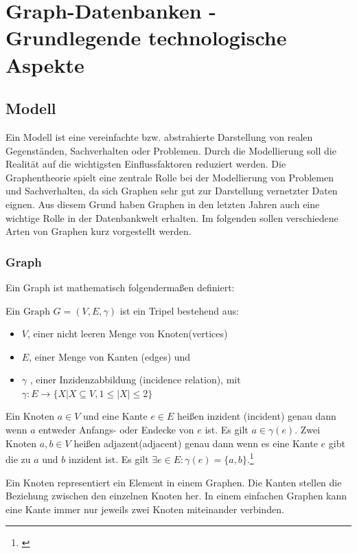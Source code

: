 \chapter{Graph-Datenbanken - Grundlegende technologische Aspekte}
\section{Modell}
Ein Modell ist eine vereinfachte bzw. abstrahierte Darstellung von realen Gegenständen, Sachverhalten oder Problemen.
Durch die Modellierung soll die Realität auf die wichtigsten Einflussfaktoren reduziert werden.
Die Graphentheorie spielt eine zentrale Rolle bei der Modellierung von Problemen und Sachverhalten, da sich Graphen sehr gut zur Darstellung vernetzter Daten eignen.
Aus diesem Grund haben Graphen in den letzten Jahren auch eine wichtige Rolle in der Datenbankwelt erhalten.
Im folgenden sollen verschiedene Arten von Graphen kurz vorgestellt werden.
\subsection{Graph}
Ein Graph ist mathematisch folgendermaßen definiert:
\begin{definition}
	Ein $\text{Graph } G=(V,E,\gamma)$ ist ein Tripel bestehend aus:
	\begin{itemize}
		\item $V$, einer nicht leeren Menge von Knoten(vertices)
		\item $E$, einer Menge von Kanten (edges) und
		\item $\gamma$ , einer Inzidenzabbildung (incidence relation), mit\\
		$\gamma : E \longrightarrow \{X | X \subseteq V, 1 \leq |X| \leq 2\}$
	\end{itemize}

	Ein Knoten $a \in V$ und eine Kante $e \in E$ heißen inzident (incident)
	genau dann wenn $a$ entweder Anfangs- oder Endecke von $e$ ist. Es gilt $a \in \gamma(e)$.
	Zwei Knoten $a,b \in V$ heißen adjazent(adjacent) genau dann wenn es eine Kante $e$ gibt die zu $a$ und $b$ inzident ist.
	Es gilt	$\exists e \in E: \gamma(e)=\{a,b\}$.\footnote{\cite[Seite 21]{pbeck01}}
\end{definition}
Ein Knoten representiert ein Element in einem Graphen.
Die Kanten stellen die Beziehung zwischen den einzelnen Knoten her.
In einem einfachen Graphen kann eine Kante immer nur jeweils zwei Knoten miteinander verbinden.

